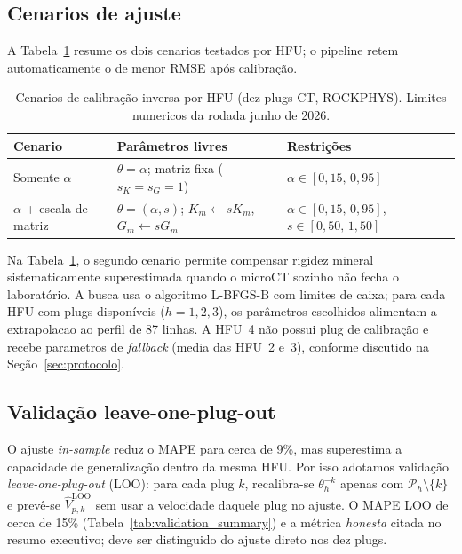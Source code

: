 \documentclass[11pt,a4paper]{article}
\numberwithin{equation}{section}
\begin{document}
\subsection{Cenarios de ajuste}

A Tabela~\ref{tab:app_calib_scenarios} resume os dois cenarios testados por
HFU; o pipeline retem automaticamente o de menor RMSE após calibração.

\begin{table}[H]
  \centering
  \caption{Cenarios de calibração inversa por HFU (dez plugs CT, ROCKPHYS).
           Limites numericos da rodada junho de 2026.}
  \label{tab:app_calib_scenarios}
  \begin{tabular}{lp{5.5cm}p{5.5cm}}
    \toprule
    Cenario & Parâmetros livres & Restrições \\
    \midrule
    Somente $\alpha$ &
    $\theta = \alpha$; matriz fixa ($s_K = s_G = 1$) &
    $\alpha \in [0{,}15,\,0{,}95]$ \\
    $\alpha$ + escala de matriz &
    $\theta = (\alpha, s)$; $K_m \leftarrow s K_m$, $G_m \leftarrow s G_m$ &
    $\alpha \in [0{,}15,\,0{,}95]$, $s \in [0{,}50,\,1{,}50]$ \\
    \bottomrule
  \end{tabular}
\end{table}

Na Tabela~\ref{tab:app_calib_scenarios}, o segundo cenario permite compensar
rigidez mineral sistematicamente superestimada quando o microCT sozinho não
fecha o laboratório.
A busca usa o algoritmo L-BFGS-B com limites de caixa; para cada HFU com
plugs disponíveis ($h=1,2,3$), os parâmetros escolhidos alimentam a
extrapolacao ao perfil de 87 linhas.
A HFU~4 não possui plug de calibração e recebe parametros de
\emph{fallback} (media das HFU~2 e~3), conforme discutido na
Seção~\ref{sec:protocolo}.

\subsection{Validação leave-one-plug-out}

O ajuste \emph{in-sample} reduz o MAPE para cerca de 9\%, mas superestima a
capacidade de generalização dentro da mesma HFU.
Por isso adotamos validação \emph{leave-one-plug-out} (LOO): para cada plug
$k$, recalibra-se $\theta_h^{-k}$ apenas com $\mathcal{P}_h \setminus \{k\}$ e
prevê-se $\widehat{V}_{p,k}^{\mathrm{LOO}}$ sem usar a velocidade daquele
plug no ajuste.
O MAPE LOO de cerca de 15\% (Tabela~\ref{tab:validation_summary}) e a métrica
\emph{honesta} citada no resumo executivo; deve ser distinguido do ajuste
direto nos dez plugs.
\end{document}

